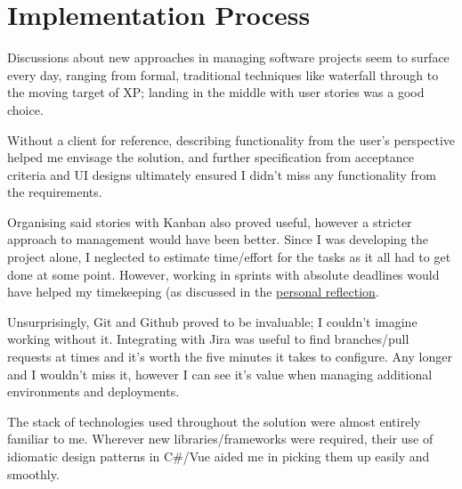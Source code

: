 \section{Implementation Process}

Discussions about new approaches in managing software
projects seem to surface every day, ranging from 
formal, traditional techniques like waterfall
through to the moving target of XP; landing in the middle
with user stories was a good choice.

Without a client for reference, describing functionality
from the user's perspective helped me envisage the solution,
and further specification from acceptance criteria and 
UI designs ultimately ensured I didn't miss any
functionality from the requirements. 

Organising said stories with Kanban also proved
useful, however a stricter approach to management would have
been better. Since I was developing the project alone, 
I neglected to estimate time/effort for the tasks as it all
had to get done at some point. However, working in sprints
with absolute deadlines would have helped my timekeeping
(as discussed in the \hyperref[s:pr]{personal reflection}.

Unsurprisingly, Git and Github proved to be invaluable; 
I couldn't imagine working without it. Integrating with Jira
was useful to find branches/pull requests at times and it's
worth the five minutes it takes to configure. Any longer and
I wouldn't miss it, however I can see it's value when
managing additional environments and deployments.

The stack of technologies used throughout the solution were
almost entirely familiar to me. Wherever new 
libraries/frameworks were required, their use of idiomatic
design patterns in C\#/Vue aided me in picking them up
easily and smoothly.